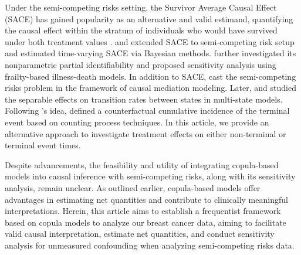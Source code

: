 \documentclass[aoas]{imsart}
\theoremstyle{plain}
\begin{document}
Under the semi-competing risks setting, the Survivor Average Causal Effect (SACE) has gained popularity as an alternative and valid estimand, quantifying the causal effect within the stratum of individuals who would have survived under both treatment values \citep{frangakis2002principal}. \cite{comment2019survivor} and \cite{xu2022bayesian} extended SACE to semi-competing risk setup and estimated time-varying SACE via Bayesian methods. \cite{Nevo2022semicompeting} further investigated its nonparametric partial identifiability and proposed sensitivity analysis using frailty-based illness-death models. In addition to SACE, \cite{huang2021causal} cast the semi-competing risks problem in the framework of causal mediation modeling. Later, \cite{deng2023separable} and \cite{breum2024} studied the separable effects on transition rates between states in multi-state models. Following \cite{huang2021causal}'s idea, \cite{deng2024direct} defined a counterfactual cumulative incidence of the terminal event based on counting process techniques. In this article, we provide an alternative approach to investigate treatment effects on either non-terminal or terminal event times.

Despite advancements, the feasibility and utility of integrating copula-based models into causal inference with semi-competing risks, along with its sensitivity analysis, remain unclear. As outlined earlier, copula-based models offer advantages in estimating net quantities and contribute to clinically meaningful interpretations. Herein, this article aims to establish a frequentist framework based on copula models to analyze our breast cancer data, aiming to facilitate valid causal interpretation, estimate net quantities, and conduct sensitivity analysis for unmeasured confounding when analyzing semi-competing risks data.  



\end{document}
